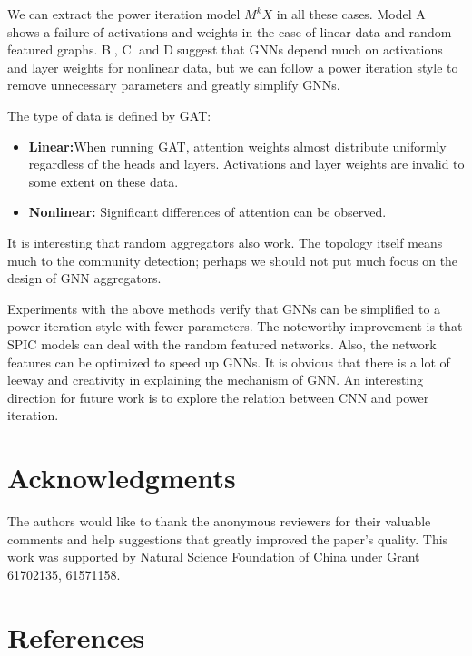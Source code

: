 \documentclass[preprint,11pt]{elsarticle}
\begin{document}
We can extract the power iteration model $M^k X$ in all these cases. Model  \textcircled{A} shows a failure of activations and weights in the case of linear data and random featured graphs. \textcircled{B}, \textcircled{C} and \textcircled{D}suggest that GNNs depend much on activations and layer weights for nonlinear data, but we can follow a power iteration style to remove unnecessary parameters and greatly simplify GNNs. 

The type of data is defined by GAT:
\begin{itemize}
	\item 
	\textbf{Linear:}When running GAT, attention weights almost distribute uniformly regardless of the heads and layers. Activations and layer weights are invalid to some extent on these data.
	\item
	\textbf{Nonlinear:} Significant differences of attention can be observed.
\end{itemize}

It is interesting that random aggregators also work. The topology itself means much to the community detection; perhaps we should not put much focus on the design of GNN aggregators.

Experiments with the above methods verify that GNNs can be simplified to a power iteration style with fewer parameters. The noteworthy improvement is that SPIC models can deal with the random featured networks. Also, the network features can be optimized to speed up GNNs. It is obvious that there is a lot of leeway and creativity in explaining the mechanism of GNN. An interesting direction for future work is to explore the relation between CNN and power iteration.

\section*{Acknowledgments}

The authors would like to thank the anonymous reviewers for their valuable comments and help suggestions that greatly improved the paper’s quality. This work was supported by Natural Science Foundation of China under Grant 61702135, 61571158. 


\section*{References}
\end{document}
